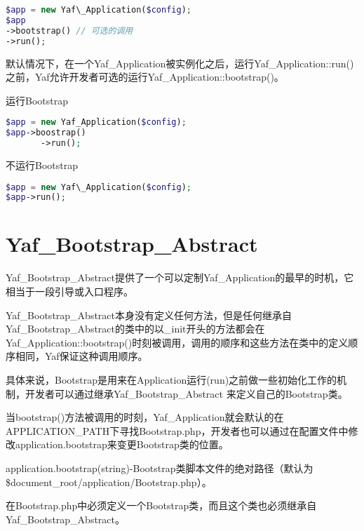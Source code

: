 \begin{lstlisting}[language=PHP]
$app = new Yaf\_Application($config);
$app
->bootstrap() // 可选的调用
->run();
\end{lstlisting}


默认情况下，在一个Yaf\_Application被实例化之后，运行Yaf\_Application::run()之前，Yaf允许开发者可选的运行Yaf\_Application::bootstrap()。

\begin{compactitem}
\item 运行Bootstrap


\begin{lstlisting}[language=PHP]
$app = new Yaf_Application($config);
$app->boostrap()
       ->run();
\end{lstlisting}

\item 不运行Bootstrap

\begin{lstlisting}[language=PHP]
$app = new Yaf\_Application($config);
$app->run();
\end{lstlisting}

\end{compactitem}



\chapter{Yaf\_Bootstrap\_Abstract}

Yaf\_Bootstrap\_Abstract提供了一个可以定制Yaf\_Application的最早的时机，它相当于一段引导或入口程序。

Yaf\_Bootstrap\_Abstract本身没有定义任何方法，但是任何继承自Yaf\_Bootstrap\_Abstract的类中的以\_init开头的方法都会在Yaf\_Application::bootstrap()时刻被调用，调用的顺序和这些方法在类中的定义顺序相同，Yaf保证这种调用顺序。

具体来说，Bootstrap是用来在Application运行(run)之前做一些初始化工作的机制，开发者可以通过继承Yaf\_Bootstrap\_Abstract 来定义自己的Bootstrap类。

当bootstrap()方法被调用的时刻，Yaf\_Application就会默认的在APPLICATION\_PATH下寻找Bootstrap.php，开发者也可以通过在配置文件中修改application.bootstrap来变更Bootstrap类的位置。

application.bootstrap(string)-Bootstrap类脚本文件的绝对路径（默认为\$document\_root/application/Bootstrap.php）。


在Bootstrap.php中必须定义一个Bootstrap类，而且这个类也必须继承自Yaf\_Bootstrap\_Abstract。


